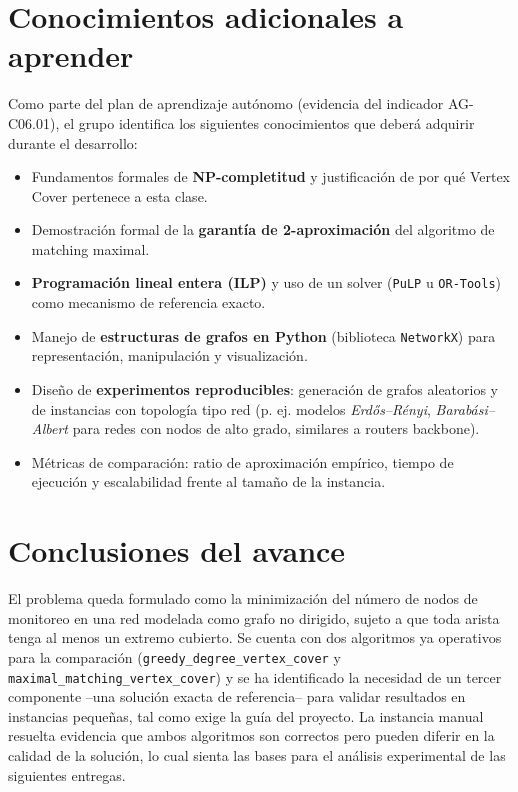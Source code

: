 \documentclass[11pt,a4paper]{article}
\begin{document}
\section{Conocimientos adicionales a aprender}

Como parte del plan de aprendizaje autónomo (evidencia del indicador AG-C06.01), el grupo
identifica los siguientes conocimientos que deberá adquirir durante el desarrollo:

\begin{itemize}[itemsep=3pt]
	\item Fundamentos formales de \textbf{NP-completitud} y justificación de por qué
	Vertex Cover pertenece a esta clase.
	\item Demostración formal de la \textbf{garantía de 2-aproximación} del algoritmo de
	matching maximal.
	\item \textbf{Programación lineal entera (ILP)} y uso de un solver
	(\texttt{PuLP} u \texttt{OR-Tools}) como mecanismo de referencia exacto.
	\item Manejo de \textbf{estructuras de grafos en Python} (biblioteca \texttt{NetworkX})
	para representación, manipulación y visualización.
	\item Diseño de \textbf{experimentos reproducibles}: generación de grafos aleatorios y
	de instancias con topología tipo red (p. ej. modelos \emph{Erdős–Rényi},
	\emph{Barabási–Albert} para redes con nodos de alto grado, similares a routers backbone).
	\item Métricas de comparación: ratio de aproximación empírico, tiempo de ejecución y
	escalabilidad frente al tamaño de la instancia.
\end{itemize}

\section{Conclusiones del avance}

El problema queda formulado como la minimización del número de nodos de monitoreo en una
red modelada como grafo no dirigido, sujeto a que toda arista tenga al menos un extremo
cubierto. Se cuenta con dos algoritmos ya operativos para la comparación
(\texttt{greedy\_degree\_vertex\_cover} y \texttt{maximal\_matching\_vertex\_cover}) y se ha
identificado la necesidad de un tercer componente --una solución exacta de referencia--
para validar resultados en instancias pequeñas, tal como exige la guía del proyecto. La
instancia manual resuelta evidencia que ambos algoritmos son correctos pero pueden diferir
en la calidad de la solución, lo cual sienta las bases para el análisis experimental de las
siguientes entregas.
\end{document}
